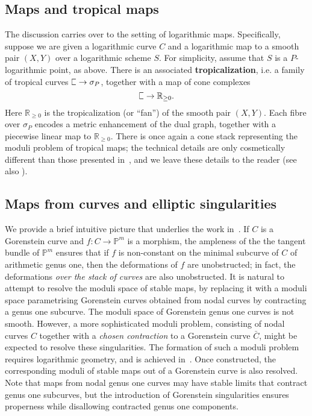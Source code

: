 \documentclass[11pt]{amsart}
\newcommand{\plC}{\scalebox{0.8}[1.3]{$\sqsubset$}}
\renewcommand{\to}{\rightarrow}
\newcommand{\RR}{\mathbb{R}}
\theoremstyle{definition}
\theoremstyle{definition}
\begin{document}
\subsection{Maps and tropical maps}The discussion carries over to the setting of logarithmic maps. Specifically, suppose we are given a logarithmic curve $C$ and a logarithmic map to a smooth pair $(X,Y)$ over a logarithmic scheme $S$. For simplicity, assume that $S$ is a $P$-logarithmic point, as above. There is an associated \textbf{tropicalization}, i.e. a family of tropical curves $\plC \to \sigma_P$, together with a map of cone complexes
\[
\plC\to \RR_{\geq 0}.
\]
Here $\RR_{\geq 0}$ is the tropicalization (or ``fan'') of the smooth pair $(X,Y)$. Each fibre over $\sigma_P$ encodes a metric enhancement of the dual graph, together with a piecewise linear map to $\RR_{\geq 0}$. There is once again a cone stack representing the moduli problem of tropical maps; the technical details are only cosmetically different than those presented in~\cite{CavalieriChanUlirschWise}, and we leave these details to the reader (see also \cite{GrossSiebertLog}).

\subsection{Maps from curves and elliptic singularities} We provide a brief intuitive picture that underlies the work in~\cite{RSPW,RSPW2}. If $C$ is a Gorenstein curve and $f:C\to \mathbb P^m$ is a morphism, the ampleness of the the tangent bundle of $\mathbb P^m$ ensures that if $f$ is non-constant on the minimal subcurve of $C$ of arithmetic genus one, then the deformations of $f$ are unobstructed; in fact, the deformations \textit{over the stack of curves} are also unobstructed. It is  natural to attempt to resolve the moduli space of stable maps, by replacing it with a moduli space parametrising Gorenstein curves obtained from nodal curves by contracting a genus one subcurve. The moduli space of Gorenstein genus one curves is not smooth. However, a more sophisticated moduli problem, consisting of nodal curves $C$ together with a \textit{chosen contraction} to a Gorenstein curve $\bar{C}$, might be expected to resolve these singularities. The formation of such a moduli problem requires logarithmic geometry, and is achieved in~\cite[Section~3]{RSPW}. Once constructed, the corresponding moduli of stable maps out of a Gorenstein curve is also resolved. Note that maps from nodal genus one curves may have stable limits that contract genus one subcurves, but the introduction of Gorenstein singularities ensures properness while disallowing contracted genus one components. 
\end{document}
